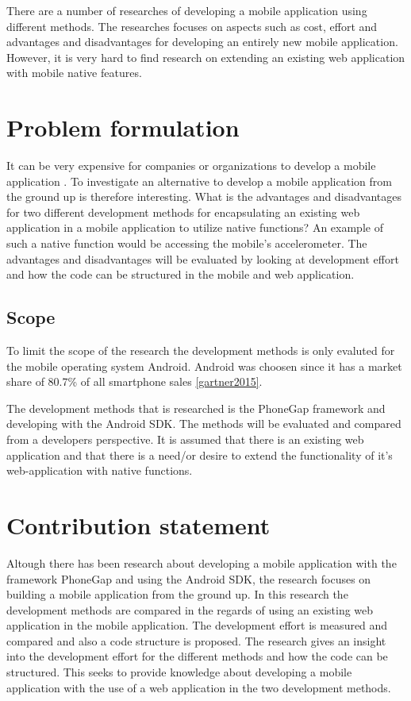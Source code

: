 There are a number of researches of developing a mobile application using different methods. The researches focuses on aspects such as cost, effort and advantages and disadvantages for developing an entirely new mobile application. However, it is very hard to find research on extending an existing web application with mobile native features. 

\section{Problem formulation}\label{section-problem-formulation}
It can be very expensive for companies or organizations to develop a mobile application \cite{kohan2015}. To investigate an alternative to develop a mobile application from the ground up is therefore interesting.
What is the advantages and disadvantages for two different development methods for encapsulating an existing web application in a mobile application to utilize native functions? An example of such a native function would be accessing the mobile's accelerometer. The advantages and disadvantages will be evaluated by looking at development effort and how the code can be structured in the mobile and web application. 

\subsection{Scope} \label{subsection-scope}
To limit the scope of the research the development methods is only evaluted for the mobile operating system Android. Android was choosen since it has a market share of 80.7\% of all smartphone sales \ref{gartner2015}.

The development methods that is researched is the PhoneGap framework and developing with the Android SDK. The methods will be evaluated and compared from a developers perspective. It is assumed that there is an existing web application and that there is a need/or desire to extend the functionality of it's web-application with native functions.

\section{Contribution statement}\label{section-contribution-statement}
Altough there has been research about developing a mobile application with the framework PhoneGap and using the Android SDK, the research focuses on building a mobile application from the ground up. In this research the development methods are compared in the regards of using an existing web application in the mobile application. The development effort is measured and compared and also a code structure is proposed. The research gives an insight into the development effort for the different methods and how the code can be structured. This seeks to provide knowledge about developing a mobile application with the use of a web application in the two development methods.

